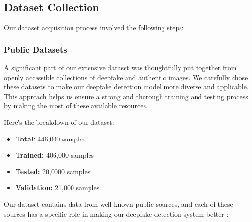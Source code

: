 \subsection{Dataset Collection}

\noindent Our dataset acquisition process involved the following steps:


\subsubsection{Public Datasets}
A significant part of our extensive dataset was thoughtfully put together from openly accessible collections of deepfake and authentic images. We carefully chose these datasets to make our deepfake detection model more diverse and applicable. This approach helps us ensure a strong and thorough training and testing process by making the most of these available resources.

Here's the breakdown of our dataset:
\begin{itemize}
    \item \textbf{Total:} 446,000 samples
    \item \textbf{Trained:} 406,000 samples
    \item \textbf{Tested:} 20,0000 samples
    \item \textbf{Validation:} 21,000 samples
\end{itemize}
Our dataset contains data from well-known public sources, and each of these sources has a specific role in making our deepfake detection system better :

